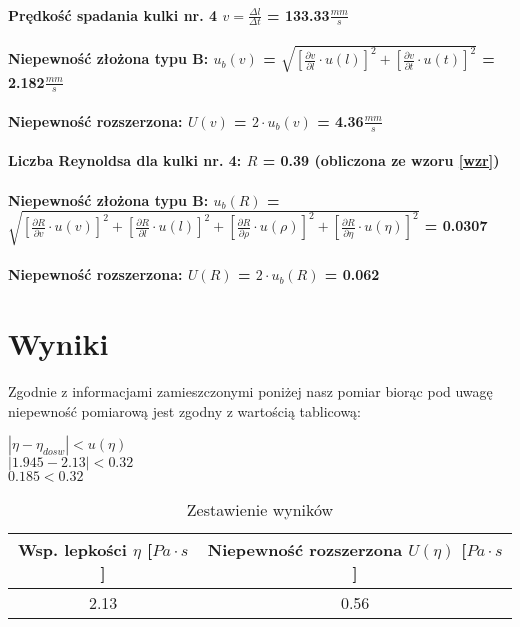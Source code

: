 \documentclass[a4paper,12pt]{article}
\begin{document}
\begin{justify}
\paragraph{Prędkość spadania kulki nr. 4  $ v = \frac{\Delta l}{\Delta t}$ =  133.33$\frac{mm}{s}$}
\paragraph{Niepewność złożona typu B: $u_{b}(v)$ = $\sqrt{[\frac{\partial v}{\partial l} \cdot u(l)]^2 + [\frac{\partial v}{\partial t} \cdot u(t)]^2}$  = 2.182$\frac{mm}{s}$}
\paragraph{Niepewność rozszerzona: $U(v)$ = $ 2 \cdot u_{b}(v)$ = 4.36$\frac{mm}{s}$}
\paragraph{Liczba Reynoldsa dla kulki nr. 4:  $R$ = 0.39 (obliczona ze wzoru \ref{wzr})}
\paragraph{Niepewność złożona typu B: $u_{b}(R)$ = $\sqrt{[\frac{\partial R}{\partial v} \cdot u(v)]^2 + [\frac{\partial R}{\partial l} \cdot u(l)]^2 + [\frac{\partial R}{\partial \rho} \cdot u(\rho)]^2 + [\frac{\partial R}{\partial \eta} \cdot u(\eta)]^2}$ = 0.0307}
\paragraph{Niepewność rozszerzona: $U(R)$ = $2 \cdot u_{b}(R)$ = 0.062}

\section{Wyniki}

Zgodnie z informacjami zamieszczonymi poniżej nasz pomiar biorąc pod uwagę niepewność pomiarową jest zgodny z wartością tablicową: \\
\begin{center}
$|\eta - \eta_{dosw}| < u(\eta)$ \\
$|1.945 - 2.13| < 0.32$ \\
$0.185 < 0.32$
\end{center}

\begin{table}[H]
\begin{center}
\begin{scriptsize}
\begin{tabular}{|c|c|}
\hline
Wsp. lepkości $\eta$ [$Pa \cdot s$] & Niepewność rozszerzona $U(\eta)$ [$Pa \cdot s$] \\
\hline
2.13 & 0.56  \\
\hline
\end{tabular}
\caption{Zestawienie wyników}
\label{table:3}
\end{scriptsize}
\end{center}
\end{table}


\end{justify}
\end{document}
